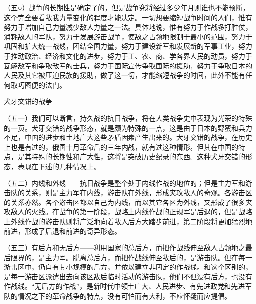 \documentclass[UTF8, 12pt, a4paper]{ctexrep}
\begin{document}
（五○）战争的长期性是确定了的，但是战争究将经过多少年月则谁也不能预断，这个完全要看敌我力量变化的程度才能决定。一切想要缩短战争时间的人们，惟有努力于增加自己力量减少敌人力量之一法。具体地说，惟有努力于作战多打胜仗，消耗敌人的军队，努力于发展游击战争，使敌之占领地限制于最小的范围，努力于巩固和扩大统一战线，团结全国力量，努力于建设新军和发展新的军事工业，努力于推动政治、经济和文化的进步，努力于工、农、商、学各界人民的动员，努力于瓦解敌军和争取敌军的士兵，努力于国际宣传争取国际的援助，努力于争取日本的人民及其它被压迫民族的援助，做了这一切，才能缩短战争的时间，此外不能有任何取巧图便的法门。

犬牙交错的战争

（五一）我们可以断言，持久战的抗日战争，将在人类战争史中表现为光荣的特殊的一页。犬牙交错的战争形态，就是颇为特殊的一点，这是由于日本的野蛮和兵力不足，中国的进步和土地广大这些矛盾因素产生出来的。犬牙交错的战争，在历史上也是有过的，俄国十月革命后的三年内战，就有过这种情形。但其在中国的特点，是其特殊的长期性和广大性，这将是突破历史纪录的东西。这种犬牙交错的形态，表现在下述的几种情况上。

（五二）内线和外线——抗日战争是整个处于内线作战的地位的；但是主力军和游击队的关系，则是主力军在内线，游击队在外线，形成夹攻敌人的奇观。各游击区的关系亦然。各个游击区都以自己为内线，而以其它各区为外线，又形成了很多夹攻敌人的火线。在战争的第一阶段，战略上内线作战的正规军是后退的，但是战略上外线作战的游击队则将广泛地向着敌人后方大踏步前进，第二阶段将更加猛烈地前进，形成了后退和前进的奇异形态。

（五三）有后方和无后方——利用国家的总后方，而把作战线伸至敌人占领地之最后限界的，是主力军。脱离总后方，而把作战线伸至敌后的，是游击队。但在每一游击区中，仍自有其小规模的后方，并依以建立非固定的作战线。和这个区别的，是每一游击区派遣出去向该区敌后临时活动的游击队，他们不但没有后方，也没有作战线。“无后方的作战”，是新时代中领土广大、人民进步、有先进政党和先进军队的情况之下的革命战争的特点，没有可怕而有大利，不应怀疑而应提倡。
\end{document}
